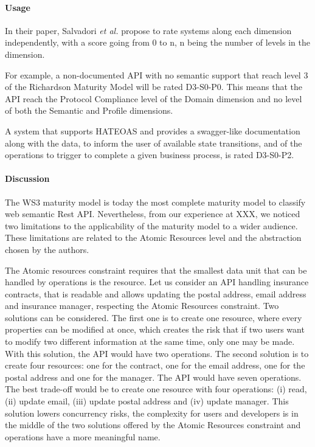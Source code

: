 \paragraph{Usage}

In their paper, Salvadori \emph{et al.} propose to rate systems along each dimension independently, with a score going from 0 to n, n being the number of levels in the dimension.

For example, a non-documented API with no semantic support that reach level 3 of the Richardson Maturity Model will be rated D3-S0-P0. This means that the API reach the Protocol Compliance level of the Domain dimension and no level of both the Semantic and Profile dimensions.


A system that supports HATEOAS and provides a swagger-like documentation along with the data, to inform the user of available state transitions, and of the operations to trigger to complete a given business process, is rated D3-S0-P2.

\paragraph{Discussion}

The WS3 maturity model is today the most complete maturity model to classify web semantic Rest API. Nevertheless, from our experience at XXX, we noticed two limitations to the applicability of the maturity model to a wider audience. These limitations are related to the Atomic Resources level and the abstraction chosen by the authors.

The Atomic resources constraint requires that the smallest data unit that can be handled by operations is the resource. Let us consider an API handling insurance contracts, that is readable and allows updating the postal address, email address and insurance manager, respecting the Atomic Resources constraint.  Two solutions can be considered. The first one is to create one resource, where every properties can be modified at once, which creates the risk that if two users want to modify two different information at the same time, only one may be made. With this solution, the API would have two operations. The second solution is to create four resources: one for the contract, one for the email address, one for the postal address and one for the manager. The API would have seven operations. The best trade-off would be to create one resource with four operations: (i) read, (ii) update email, (iii) update postal address and (iv) update manager. This solution lowers concurrency risks, the complexity for users and developers is in the middle of the two solutions offered by the Atomic Resources constraint and operations have a more meaningful name.

